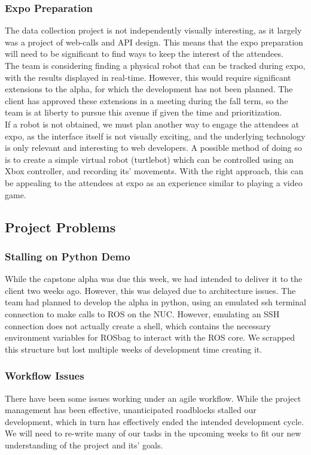 \documentclass[onecolumn, draftclsnofoot,10pt, compsoc]{IEEEtran}
\begin{document}
\subsubsection{Expo Preparation}
The data collection project is not independently visually interesting, as it largely was a project of web-calls and API design. This means that the expo preparation will need to be significant to find ways to keep the interest of the attendees. \\
The team is considering finding a physical robot that can be tracked during expo, with the results displayed in real-time. However, this would require significant extensions to the alpha, for which the development has not been planned. The client has approved these extensions in a meeting during the fall term, so the team is at liberty to pursue this avenue if given the time and prioritization. \\
If a robot is not obtained, we must plan another way to engage the attendees at expo, as the interface itself is not visually exciting, and the underlying technology is only relevant and interesting to web developers. A possible method of doing so is to create a simple virtual robot (turtlebot) which can be controlled using an Xbox controller, and recording its’ movements. With the right approach, this can be appealing to the attendees at expo as an experience similar to playing a video game.


\subsection{Project Problems}

\subsubsection{Stalling on Python Demo}
While the capstone alpha was due this week, we had intended to deliver it to the client two weeks ago. However, this was delayed due to architecture issues. The team had planned to develop the alpha in python, using an emulated ssh terminal connection to make calls to ROS on the NUC. However, emulating an SSH connection does not actually create a shell, which contains the necessary environment variables for ROSbag to interact with the ROS core. We scrapped this structure but lost multiple weeks of development time creating it.

\subsubsection{Workflow Issues}
There have been some issues working under an agile workflow. While the project management has been effective, unanticipated roadblocks stalled our development, which in turn has effectively ended the intended development cycle. We will need to re-write many of our tasks in the upcoming weeks to fit our new understanding of the project and its’ goals.

%
\end{document}
